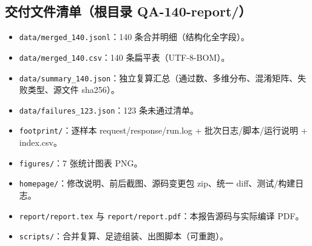 \documentclass[11pt,a4paper]{ctexart}
\begin{document}
\subsection{交付文件清单（根目录 QA-140-report/）}
\begin{itemize}
\item \texttt{data/merged\_140.jsonl}：140 条合并明细（结构化全字段）。
\item \texttt{data/merged\_140.csv}：140 条扁平表（UTF-8-BOM）。
\item \texttt{data/summary\_140.json}：独立复算汇总（通过数、多维分布、混淆矩阵、失败类型、源文件 sha256）。
\item \texttt{data/failures\_123.json}：123 条未通过清单。
\item \texttt{footprint/}：逐样本 request/response/run.log + 批次日志/脚本/运行说明 + index.csv。
\item \texttt{figures/}：7 张统计图表 PNG。
\item \texttt{homepage/}：修改说明、前后截图、源码变更包 zip、统一 diff、测试/构建日志。
\item \texttt{report/report.tex} 与 \texttt{report/report.pdf}：本报告源码与实际编译 PDF。
\item \texttt{scripts/}：合并复算、足迹组装、出图脚本（可重跑）。
\end{itemize}
\end{document}
